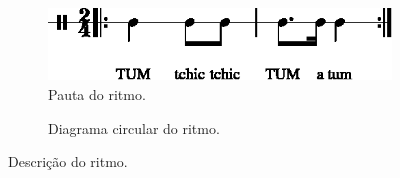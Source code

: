 \begin{figure}[H]
\centering
     \begin{subfigure}[c]{0.45\textwidth}
         \centering
         \includegraphics[width=\textwidth]{chapters/cap-musicalidade-percepcion/treino-ritmo5-1.eps}
         \caption{Pauta do ritmo.}
         \label{fig:Ritmocomplexo1:1}
     \end{subfigure}
     \hfill
     \begin{subfigure}[c]{0.45\textwidth}
         \centering
{}
         \caption{Diagrama circular do ritmo.}
         \label{fig:Ritmocomplexo1:2}
     \end{subfigure}
\caption{Descrição do ritmo.}
\label{fig:abc-percepcionritmica5}
\end{figure}





